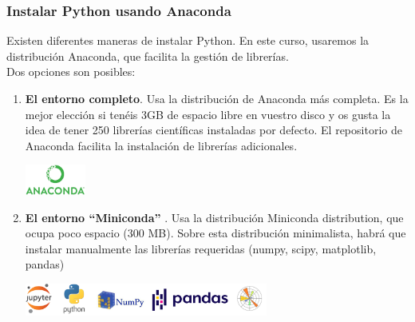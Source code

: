 \documentclass[9pt]{beamer}
\begin{document}
\begin{frame}
  \frametitle{Instalar Python usando Anaconda}
  Existen diferentes maneras de instalar Python. En este curso,
  usaremos la distribución Anaconda, que facilita la gestión de librerías.\\
  Dos opciones son posibles:
  \begin{enumerate}
  \item \textbf{El entorno completo}. Usa la distribución de Anaconda
    más completa. Es la mejor elección si tenéis 3GB de espacio libre
    en vuestro disco y os gusta la idea de tener 250 librerías
    científicas instaladas por defecto. El repositorio de Anaconda
    facilita la instalación de librerías adicionales.
    \begin{center}
      \includegraphics[width=2cm]{anaconda_logo}
    \end{center}

  \item \textbf{El entorno ``Miniconda'' }. Usa la distribución Miniconda
    distribution, que ocupa poco espacio (300 MB). Sobre esta
    distribución minimalista, habrá que instalar manualmente las
    librerías requeridas (numpy, scipy,
    matplotlib, pandas)
    \begin{center}
      \includegraphics[width=8cm]{jupyter_python_numpy_pandas}
    \end{center}

  \end{enumerate}
\end{frame}
\end{document}
